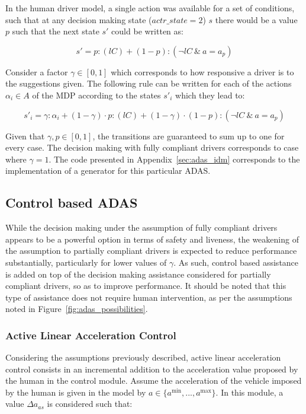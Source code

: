 In the human driver model, a single action was available for a set of conditions, such that at any decision making state ($actr\_state = 2$) $s$ there would be a value $p$ such that the next state $s'$ could be written as:

\begin{equation}
s' = p: (lC) + (1 - p): (\neg lC \:\&\: a = a_p)
\end{equation}

Consider a factor $\gamma \in [0,1]$ which corresponds to how responsive a driver is to the suggestions given. The following rule can be written for each of the actions $\alpha_i \in A$ of the MDP according to the states $s'_i$ which they lead to:

\begin{equation}
s'_i = \gamma: \alpha_i + (1-\gamma)\cdot p:(lC) + (1-\gamma)\cdot (1-p):(\neg lC \:\&\: a = a_p)
\end{equation}

Given that $\gamma, p \in [0,1]$, the transitions are guaranteed to sum up to one for every case. The decision making with fully compliant drivers corresponds to case where $\gamma = 1$. The code presented in Appendix~\ref{sec:adas_idm} corresponds to the implementation of a generator for this particular ADAS.

\subsection{Control based ADAS}

While the decision making under the assumption of fully compliant drivers appears to be a powerful option in terms of safety and liveness, the weakening of the assumption to partially compliant drivers is expected to reduce performance substantially, particularly for lower values of $\gamma$. As such, control based assistance is added on top of the decision making assistance considered for partially compliant drivers, so as to improve performance. It should be noted that this type of assistance does not require human intervention, as per the assumptions noted in Figure~\ref{fig:adas_possibilities}.

\subsubsection{Active Linear Acceleration Control}

Considering the assumptions previously described, active linear acceleration control consists in an incremental addition to the acceleration value proposed by the human in the control module. Assume the acceleration of the vehicle imposed by the human is given in the model by $a \in \{a^{\min},...,a^{\max}\}$. In this module, a value $\Delta a_{as}$ is considered such that:

